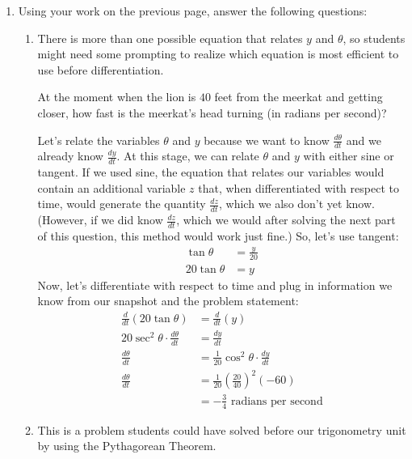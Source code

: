 \documentclass{article}
\begin{document}
\begin{enumerate}
\begin{enumerate}
\begin{solution}
\begin{center}
\begin{tikzpicture}[scale=0.4]
     \end{tikzpicture}
     \end{center}
    \end{solution}
    \vfill\vfill
    \newpage
\item Using your work on the previous page, answer the following questions:
\begin{enumerate}
    \item 
    \begin{workshop}
    There is more than one possible equation that relates $y$ and $\theta$, so students might need some prompting to realize which equation is most efficient to use before differentiation.
    \end{workshop}
    At the moment when the lion is $40$ feet from the meerkat and getting closer, how fast is the meerkat's head turning (in radians per second)?
    
    \begin{solution}
        Let's relate the variables $\theta$ and $y$ because we want to know $\frac{d\theta}{dt}$ and we already know $\frac{dy}{dt}$. At this stage, we can relate $\theta$ and $y$ with either sine or tangent. If we used sine, the equation that relates our variables would contain an additional variable $z$ that, when differentiated with respect to time, would generate the quantity $\frac{dz}{dt}$, which we also don't yet know. (However, if we did know $\frac{dz}{dt}$, which we would after solving the next part of this question, this method would work just fine.) So, let's use tangent:
    \begin{align*}
            \tan \theta &= \frac{y}{20} \\
            20 \tan \theta &= y
    \end{align*}
    Now, let's differentiate with respect to time and plug in information we know from our snapshot and the problem statement:
    \begin{align*}
            \frac{d}{dt}(20 \tan \theta) &= \frac{d}{dt}(y) \\
            20\sec^2 \theta \cdot \frac{d\theta}{dt}&= \frac{dy}{dt} \\
            \frac{d\theta}{dt}&=\frac{1}{20}\cos^2 \theta \cdot \frac{dy}{dt} \\
            \frac{d\theta}{dt}&=\frac{1}{20}\left(\frac{20}{40}\right)^2 (-60) \\
            &=-\frac{3}{4}\text{ radians per second}
    \end{align*}
    \end{solution}
    \vfill\vfill
    \item
    \begin{workshop}
   This is a problem students could have solved before our trigonometry unit by using the Pythagorean Theorem. 
    \end{workshop}
    

\end{enumerate}
\end{enumerate}
\end{enumerate}
\end{document}
